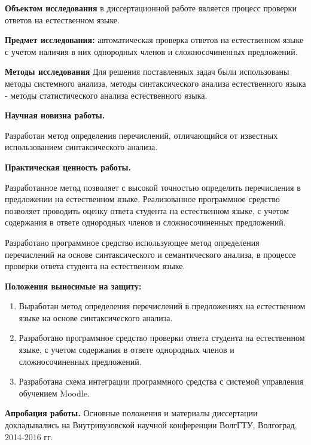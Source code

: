 \documentclass[a4paper]{G2-105}
\begin{document}
\par \textbf{Объектом исследования} в диссертационной работе является процесс проверки ответов на естественном языке.
\par \textbf{Предмет исследования:} автоматическая проверка ответов на естественном языке с учетом наличия в них однородных членов и сложносочиненных предложений.
\par \textbf{Методы исследования} Для решения поставленных задач были использованы методы системного анализа, методы синтаксического анализа естественного языка - методы статистического анализа естественного языка.

\par \textbf{Научная новизна работы.} %
\par Разработан метод определения перечислений, отличающийся от известных использованием синтаксического анализа.

\par \textbf{Практическая ценность работы.} %
\par Разработанное метод позволяет с высокой точностью определить перечисления в предложении на естественном языке. Реализованное программное средство позволяет проводить оценку ответа студента на естественном языке, с учетом содержания в ответе однородных членов и сложносочиненных предложений.
\par Разработано программное средство использующее метод определения перечислений на основе синтаксического и семантического анализа, в процессе проверки ответа студента на естественном языке.

\par \textbf{Положения выносимые на защиту:} %
\begin{enumerate}
    \item Выработан метод определения перечислений в предложениях на естественном языке на основе синтаксического анализа.
    \item Разработано программное средство проверки ответа студента на естественном языке, с учетом содержания в ответе однородных членов и сложносочиненных предложений.
    \item Разработана схема интеграции программного средства с системой управления обучением Moodle.
\end{enumerate}
\par \textbf{Апробация работы.} Основные положения и материалы диссертации докладывались на Внутривузовской научной конференции ВолгГТУ, Волгоград, 2014-2016 гг.
\end{document}
